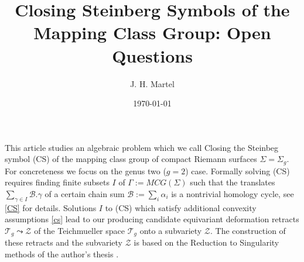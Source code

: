 \documentclass[12pt]{amsart}
\theoremstyle{definition}
\theoremstyle{remark}
\newcommand{\sB}{\mathscr{B}}
\newcommand{\sT}{\mathscr{T}}
\newcommand{\sZ}{\mathscr{Z}}
\begin{document}
\title{Closing Steinberg Symbols of the Mapping Class Group: Open Questions}
\author{J. H. Martel}
\date{\today}

\maketitle

This article studies an algebraic problem which we call Closing the Steinbeg symbol (CS) of the mapping class group of compact Riemann surfaces $\Sigma = \Sigma_g$. For concreteness we focus on the genus two ($g=2$) case. Formally solving (CS) requires finding finite subsets $I$ of $\Gamma:=MCG(\Sigma)$ such that the translates $\sum_{\gamma \in I}\sB.\gamma$ of a certain chain sum $\sB:=\sum_i \alpha_i$ is a nontrivial homology cycle, see \ref{CS} for details. Solutions $I$ to (CS) which satisfy additional convexity assumptions \eqref{cs} lead to our producing candidate equivariant deformation retracts $\sT_g \leadsto \sZ$ of the Teichmueller space $\sT_g$ onto a subvariety $\sZ$. The construction of these retracts and the subvariety $\sZ$ is based on the Reduction to Singularity methods of the author's thesis \cite{martel}. 





\end{document}
